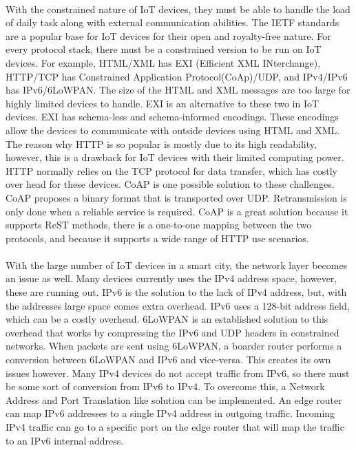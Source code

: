 \documentclass[a4paper,12pt]{article}
\begin{document}
\paragraph{}
With the constrained nature of IoT devices, they must be able to handle the load of daily task along with external communication abilities. The IETF standards are a popular base for IoT devices for their open and royalty-free nature. For every protocol stack, there must be a constrained version to be run on IoT devices. For example, HTML/XML has EXI (Efficient XML INterchange), HTTP/TCP has Constrained Application Protocol(CoAp)/UDP, and IPv4/IPv6 has IPv6/6LoWPAN. The size of the HTML and XML messages are too large for highly limited devices to handle. EXI is an alternative to these two in IoT devices. EXI has schema-less and schema-informed encodings. These encodings allow the devices to communicate with outside devices using HTML and XML. The reason why HTTP is so popular is mostly due to its high readability, however, this is a drawback for IoT devices with their limited computing power. HTTP normally relies on the TCP protocol for data transfer, which has costly over head for these devices. CoAP is one possible solution to these challenges. CoAP proposes a binary format that is transported over UDP. Retransmission is only done when a reliable service is required. CoAP is a great solution because it supports ReST methods, there is a one-to-one mapping between the two protocols, and because it supports a wide range of HTTP use scenarios. 
\paragraph{}
With the large number of IoT devices in a smart city, the network layer becomes an issue as well. Many devices currently uses the IPv4 address space, however, these are running out. IPv6 is the solution to the lack of IPv4 address, but, with the addresses large space comes extra overhead. IPv6 uses a 128-bit address field, which can be a costly overhead. 6LoWPAN is an established solution to this overhead that works by compressing the IPv6 and UDP headers in constrained networks. When packets are sent using 6LoWPAN, a boarder router performs a conversion between 6LoWPAN and IPv6 and vice-versa. This creates its own issues however. Many IPv4 devices do not accept traffic from IPv6, so there must be some sort of conversion from IPv6 to IPv4. To overcome this, a Network Address and Port Translation like solution can be implemented. An edge router can map IPv6 addresses to a single IPv4 address in outgoing traffic. Incoming IPv4 traffic can go to a specific port on the edge router that will map the traffic to an IPv6 internal address.
\end{document}
